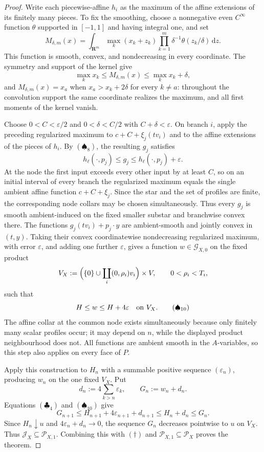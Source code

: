 \begin{proof}
Write each piecewise-affine $h_i$ as the maximum of the affine
extensions of its finitely many pieces.  To fix the smoothing, choose a
nonnegative even $C^\infty$ function $\theta$ supported in $[-1,1]$
and having integral one, and set
\[
 M_{\delta,m}(x)=\int_{\mathbf R^m}\max_k(x_k+z_k)
     \prod_{k=1}^m\delta^{-1}\theta(z_k/\delta)\,\mathrm{d}z.
\]
This function is smooth, convex, and nondecreasing in every coordinate.
The symmetry and support of the kernel give
\[
 \max_kx_k\leq M_{\delta,m}(x)\leq\max_kx_k+\delta,
\]
and $M_{\delta,m}(x)=x_a$ when
$x_a>x_k+2\delta$ for every $k\ne a$: throughout the convolution
support the same coordinate realizes the maximum, and all first moments of
the kernel vanish.

Choose $0<C<\varepsilon/2$ and $0<\delta<C/2$ with
$C+\delta<\varepsilon$.  On branch $i$, apply the preceding
regularized maximum to $c+C+\xi_j(tv_i)$ and to the affine extensions of
the pieces of $h_i$.  By $(\spadesuit_8)$, the resulting $g_j$ satisfies
\[
                  h_\ell(\cdot,p_j)\leq g_j
                  \leq h_\ell(\cdot,p_j)+\varepsilon.
 \tag{$\spadesuit_9$}
\]
At the node the first input exceeds every other input by at least $C$,
so on an initial interval of every branch the regularized maximum equals
the single ambient affine function $c+C+\xi_j$.  Since the star and the
set of profiles are finite, the corresponding node collars may be chosen
simultaneously.  Thus every $g_j$ is smooth ambient-induced on the fixed
smaller substar and branchwise convex there.
The functions \(g_j(tv_i)+p_j\mathbin\cdot y\) are ambient-smooth and
jointly convex in \((t,y)\).  Taking their convex coordinatewise
nondecreasing regularized maximum, with error \(\varepsilon\), and adding
one further \(\varepsilon\), gives a function
\(w\in\mathcal G_{X,0}\) on the fixed product
\[
 V_X:=\Bigl(\{0\}\cup\coprod_i(0,\rho_i)v_i\Bigr)\times V,
 \qquad 0<\rho_i<T_i,
\]
such that
\[
                         H\leq w\leq H+4\varepsilon
 \quad\text{on }V_X.
 \tag{\(\spadesuit_{10}\)}
\]
The affine collar at the common node exists simultaneously because only
finitely many scalar profiles occur; it may depend on \(n\), while the
displayed product neighbourhood does not.  All functions are ambient smooth
in the \(A\)-variables, so this step also applies on every face of \(P\).

Apply this construction to \(H_n\) with a summable positive sequence
\((\varepsilon_n)\), producing \(w_n\) on the one fixed \(V_X\).  Put
\[
 d_n:=4\sum_{k>n}\varepsilon_k,
 \qquad G_n:=w_n+d_n.
\]
Equations \((\clubsuit_4)\) and \((\spadesuit_{10})\) give
\[
 G_{n+1}\leq H_{n+1}+4\varepsilon_{n+1}+d_{n+1}
 \leq H_n+d_n\leq G_n.
\]
Since \(H_n\downarrow u\) and \(4\varepsilon_n+d_n\to0\), the sequence
\(G_n\) decreases pointwise to \(u\) on \(V_X\).  Thus
\(\mathcal J_X\subseteq\mathcal P_{X,1}\).  Combining this with
\((\dagger)\) and \(\mathcal P_{X,1}\subseteq\mathcal P_X\) proves the
theorem.
\end{proof}
